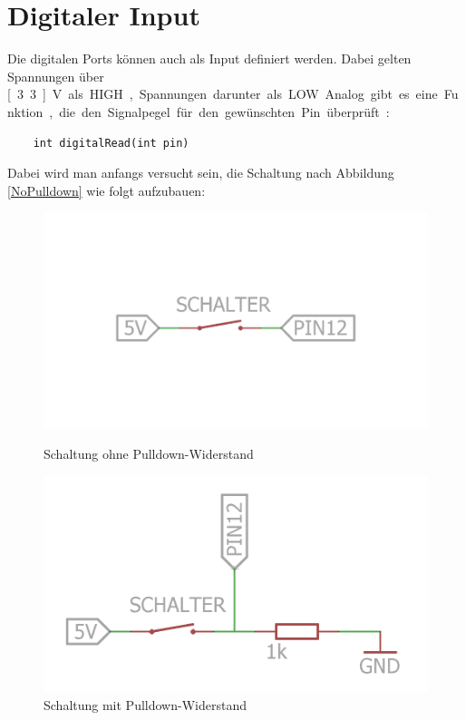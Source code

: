 \documentclass[10pt,a4paper]{article}
\begin{document}
\section{Digitaler Input}
\label{DigitalInput}
Die digitalen Ports können auch als Input definiert werden. Dabei gelten Spannungen über \unit[3.3]{V} als HIGH, Spannungen darunter als LOW. Analog gibt es eine Funktion, die den Signalpegel für den gewünschten Pin überprüft:
\begin{lstlisting}
	int digitalRead(int pin)
\end{lstlisting}
\bigskip

Dabei wird man anfangs versucht sein, die Schaltung nach Abbildung \ref{NoPulldown} wie folgt aufzubauen:

\begin{figure}[htbp!]
\begin{minipage}{0.5\textwidth}
	\includegraphics[width=\textwidth]{NoPulldown.png}
	\caption{Schaltung ohne Pulldown-Widerstand}	
	\label{NoPulldown}
\end{minipage}
\begin{minipage}{0.5\textwidth}
	\includegraphics[width=\textwidth]{Pulldown.png}
	\caption{Schaltung mit Pulldown-Widerstand}
	\label{Pulldown}
\end{minipage}
\end{figure}
\end{document}
